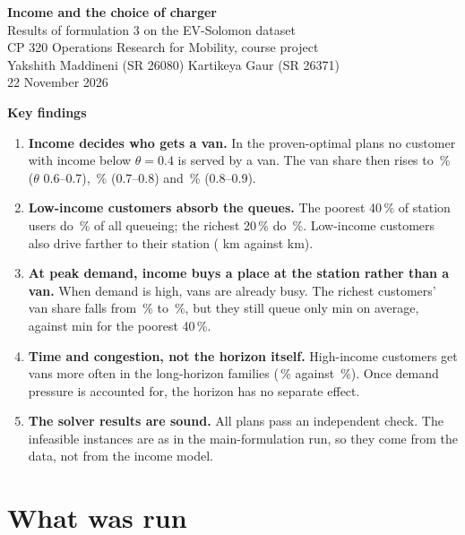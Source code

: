 \documentclass[11pt,a4paper]{article}
\newcommand{\pct}{\,\%}
\newcommand{\sect}[1]{\section{#1}}
\begin{document}
\begin{center}
{\LARGE\bfseries\color{headblue} Income and the choice of charger}\\[6pt]
{\large Results of formulation 3 on the EV-Solomon dataset}\\[4pt]
{\normalsize CP 320 Operations Research for Mobility, course project}\\[2pt]
{\normalsize Yakshith Maddineni (SR 26080) \quad\textperiodcentered\quad Kartikeya Gaur (SR 26371)}\\[2pt]
{\normalsize 22 November 2026}
\end{center}

\begin{keybox}
{\color{headblue}\textbf{Key findings}}
\begin{enumerate}[leftmargin=1.4em]
  \item \textbf{Income decides who gets a van.} In the proven-optimal plans no customer with income below $\theta=0.4$ is served by a van. The van share then rises to \VanSixSeven\pct{} ($\theta$ 0.6--0.7), \VanSevenEight\pct{} (0.7--0.8) and \VanEightNine\pct{} (0.8--0.9).
  \item \textbf{Low-income customers absorb the queues.} The poorest 40\pct{} of station users do \QShareBottom\pct{} of all queueing; the richest 20\pct{} do \QShareTop\pct{}. Low-income customers also drive farther to their station (\DriveBot{} km against \DriveTop{} km).
  \item \textbf{At peak demand, income buys a place at the station rather than a van.} When demand is high, vans are already busy. The richest customers' van share falls from \TopLow\pct{} to \TopHigh\pct{}, but they still queue only \TopQHigh{} min on average, against \LowQHigh{} min for the poorest 40\pct.
  \item \textbf{Time and congestion, not the horizon itself.} High-income customers get vans more often in the long-horizon families (\TopLong\pct{} against \TopShort\pct{}). Once demand pressure is accounted for, the horizon has no separate effect.
  \item \textbf{The solver results are sound.} All \NValid{} plans pass an independent check. The \NInf{} infeasible instances are \InfSame{} as in the main-formulation run, so they come from the data, not from the income model.
\end{enumerate}
\end{keybox}

\sect{What was run}
\end{document}

